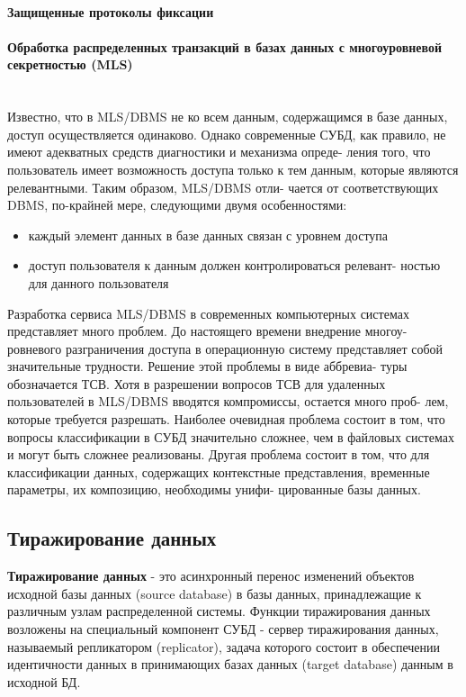 \paragraph{Защищенные протоколы фиксации}
\paragraph{Обработка распределенных транзакций в базах данных с многоуровневой секретностью (MLS)}~\\
Известно, что в MLS/DBMS не ко всем данным, содержащимся в  базе
данных, доступ осуществляется одинаково. Однако современные СУБД, как
правило,  не имеют адекватных средств диагностики и механизма опреде-
ления того, что пользователь имеет возможность доступа только  к  тем
данным,  которые являются релевантными. Таким образом, MLS/DBMS отли-
чается от соответствующих DBMS,  по-крайней  мере,  следующими  двумя
особенностями:
\begin{itemize}
    \item каждый элемент данных в базе данных связан с уровнем доступа
    \item доступ пользователя к данным должен контролироваться релевант-
ностью для данного пользователя
\end{itemize}
Разработка сервиса MLS/DBMS в современных компьютерных  системах
представляет  много  проблем. До настоящего времени внедрение многоу-
ровневого разграничения доступа в операционную  систему  представляет
собой  значительные трудности. Решение этой проблемы в виде аббревиа-
туры обозначается ТСВ. Хотя в разрешении вопросов ТСВ  для  удаленных
пользователей  в  MLS/DBMS вводятся компромиссы, остается много проб-
лем, которые требуется разрешать. Наиболее очевидная проблема состоит
в том, что вопросы классификации в СУБД значительно  сложнее,  чем  в
файловых  системах  и могут быть сложнее реализованы. Другая проблема
состоит в том, что для классификации данных,  содержащих  контекстные
представления,  временные параметры, их композицию, необходимы унифи-
цированные базы данных.

\subsection{Тиражирование данных}
\textbf{Тиражирование данных} - это асинхронный перенос изменений объектов исходной базы данных (source database)
в базы данных, принадлежащие к различным узлам распределенной системы.
Функции тиражирования данных возложены на специальный компонент СУБД - сервер тиражирования данных,
называемый репликатором (replicator), задача которого состоит в обеспечении идентичности данных в принимающих
базах данных (target database) данным в исходной БД.

